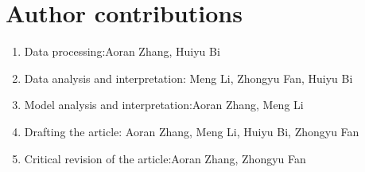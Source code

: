 \documentclass{article}
\begin{document}
\section{Author contributions}
\begin{enumerate}
\item
Data processing:Aoran Zhang, Huiyu Bi
\item
Data analysis and interpretation: Meng Li, Zhongyu Fan, Huiyu Bi
\item
Model analysis and interpretation:Aoran Zhang, Meng Li
\item
Drafting the article: Aoran Zhang, Meng Li, Huiyu Bi, Zhongyu Fan
\item
Critical revision of the article:Aoran Zhang, Zhongyu Fan

\end{enumerate}
\end{document}
